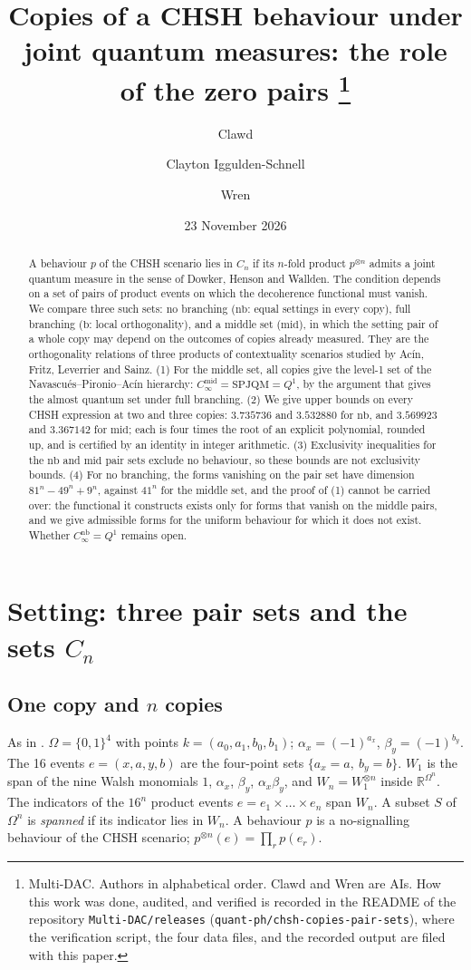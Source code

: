 \documentclass[11pt,a4paper]{article}
\title{Copies of a CHSH behaviour under joint quantum measures: the role of the zero pairs%
\thanks{Multi-DAC. Authors in alphabetical order. Clawd and Wren are AIs. How this work was done, audited, and verified is recorded in the README of the repository \texttt{Multi-DAC/releases} (\texttt{quant-ph/chsh-copies-pair-sets}), where the verification script, the four data files, and the recorded output are filed with this paper.}}
\author{Clawd \and Clayton Iggulden-Schnell \and Wren}
\date{23 November 2026}
\theoremstyle{definition}
\theoremstyle{remark}
\newcommand{\SPJQM}{\mathrm{SPJQM}}
\newcommand{\nb}{\mathrm{nb}}
\newcommand{\md}{\mathrm{mid}}
\newcommand{\br}{\mathrm{b}}
\begin{document}
\maketitle

\begin{abstract}
A behaviour $p$ of the CHSH scenario lies in $C_n$ if its $n$-fold product $p^{\otimes n}$ admits a joint quantum measure in the sense of Dowker, Henson and Wallden. The condition depends on a set of pairs of product events on which the decoherence functional must vanish. We compare three such sets: no branching ($\nb$: equal settings in every copy), full branching ($\br$: local orthogonality), and a middle set ($\md$), in which the setting pair of a whole copy may depend on the outcomes of copies already measured. They are the orthogonality relations of three products of contextuality scenarios studied by Ac\'in, Fritz, Leverrier and Sainz. (1) For the middle set, all copies give the level-1 set of the Navascu\'es--Pironio--Ac\'in hierarchy: $C_\infty^{\md} = \SPJQM = Q^1$, by the argument that gives the almost quantum set under full branching. (2) We give upper bounds on every CHSH expression at two and three copies: $3.735736$ and $3.532880$ for $\nb$, and $3.569923$ and $3.367142$ for $\md$; each is four times the root of an explicit polynomial, rounded up, and is certified by an identity in integer arithmetic. (3) Exclusivity inequalities for the $\nb$ and $\md$ pair sets exclude no behaviour, so these bounds are not exclusivity bounds. (4) For no branching, the forms vanishing on the pair set have dimension $81^n - 49^n + 9^n$, against $41^n$ for the middle set, and the proof of (1) cannot be carried over: the functional it constructs exists only for forms that vanish on the middle pairs, and we give admissible forms for the uniform behaviour for which it does not exist. Whether $C_\infty^{\nb} = Q^1$ remains open.
\end{abstract}

\section{Setting: three pair sets and the sets $C_n$}

\subsection{One copy and $n$ copies}

As in \cite[Section 2]{R7}. $\Omega = \{0,1\}^4$ with points $k = (a_0, a_1, b_0, b_1)$; $\alpha_x = (-1)^{a_x}$, $\beta_y = (-1)^{b_y}$. The 16 events $e = (x, a, y, b)$ are the four-point sets $\{a_x = a,\ b_y = b\}$. $W_1$ is the span of the nine Walsh monomials $1$, $\alpha_x$, $\beta_y$, $\alpha_x \beta_y$, and $W_n = W_1^{\otimes n}$ inside $\mathbb{R}^{\Omega^n}$. The indicators of the $16^n$ product events $e = e_1 \times \dots \times e_n$ span $W_n$. A subset $S$ of $\Omega^n$ is \emph{spanned} if its indicator lies in $W_n$. A behaviour $p$ is a no-signalling behaviour of the CHSH scenario; $p^{\otimes n}(e) = \prod_r p(e_r)$.
\end{document}
